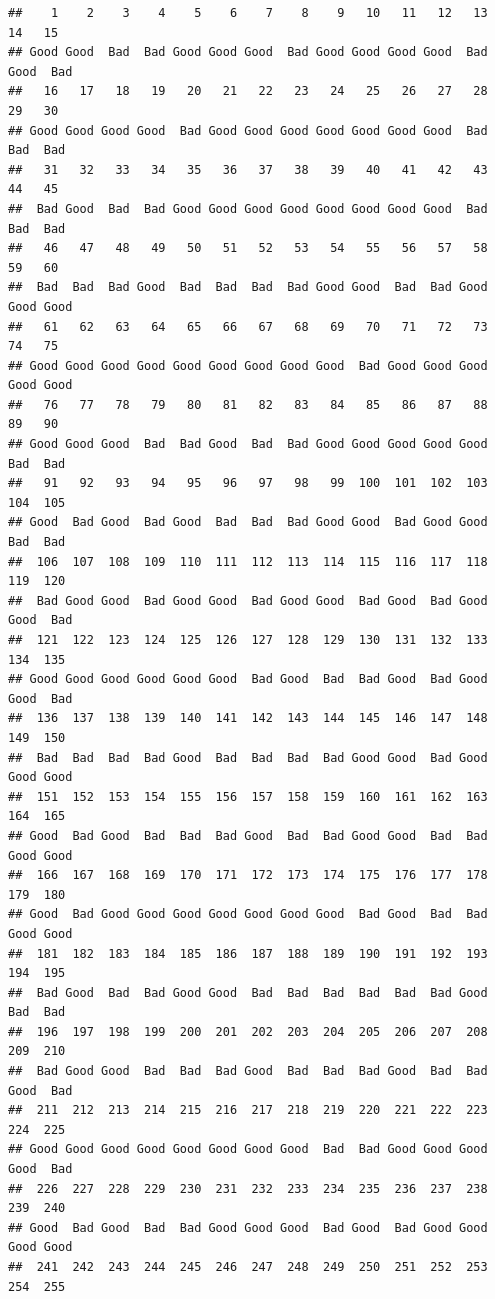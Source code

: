 \documentclass[]{article}
\begin{document}
\begin{verbatim}
##    1    2    3    4    5    6    7    8    9   10   11   12   13   14   15 
## Good Good  Bad  Bad Good Good Good  Bad Good Good Good Good  Bad Good  Bad 
##   16   17   18   19   20   21   22   23   24   25   26   27   28   29   30 
## Good Good Good Good  Bad Good Good Good Good Good Good Good  Bad  Bad  Bad 
##   31   32   33   34   35   36   37   38   39   40   41   42   43   44   45 
##  Bad Good  Bad  Bad Good Good Good Good Good Good Good Good  Bad  Bad  Bad 
##   46   47   48   49   50   51   52   53   54   55   56   57   58   59   60 
##  Bad  Bad  Bad Good  Bad  Bad  Bad  Bad Good Good  Bad  Bad Good Good Good 
##   61   62   63   64   65   66   67   68   69   70   71   72   73   74   75 
## Good Good Good Good Good Good Good Good Good  Bad Good Good Good Good Good 
##   76   77   78   79   80   81   82   83   84   85   86   87   88   89   90 
## Good Good Good  Bad  Bad Good  Bad  Bad Good Good Good Good Good  Bad  Bad 
##   91   92   93   94   95   96   97   98   99  100  101  102  103  104  105 
## Good  Bad Good  Bad Good  Bad  Bad  Bad Good Good  Bad Good Good  Bad  Bad 
##  106  107  108  109  110  111  112  113  114  115  116  117  118  119  120 
##  Bad Good Good  Bad Good Good  Bad Good Good  Bad Good  Bad Good Good  Bad 
##  121  122  123  124  125  126  127  128  129  130  131  132  133  134  135 
## Good Good Good Good Good Good  Bad Good  Bad  Bad Good  Bad Good Good  Bad 
##  136  137  138  139  140  141  142  143  144  145  146  147  148  149  150 
##  Bad  Bad  Bad  Bad Good  Bad  Bad  Bad  Bad Good Good  Bad Good Good Good 
##  151  152  153  154  155  156  157  158  159  160  161  162  163  164  165 
## Good  Bad Good  Bad  Bad  Bad Good  Bad  Bad Good Good  Bad  Bad Good Good 
##  166  167  168  169  170  171  172  173  174  175  176  177  178  179  180 
## Good  Bad Good Good Good Good Good Good Good  Bad Good  Bad  Bad Good Good 
##  181  182  183  184  185  186  187  188  189  190  191  192  193  194  195 
##  Bad Good  Bad  Bad Good Good  Bad  Bad  Bad  Bad  Bad  Bad Good  Bad  Bad 
##  196  197  198  199  200  201  202  203  204  205  206  207  208  209  210 
##  Bad Good Good  Bad  Bad  Bad Good  Bad  Bad  Bad Good  Bad  Bad Good  Bad 
##  211  212  213  214  215  216  217  218  219  220  221  222  223  224  225 
## Good Good Good Good Good Good Good Good  Bad  Bad Good Good Good Good  Bad 
##  226  227  228  229  230  231  232  233  234  235  236  237  238  239  240 
## Good  Bad Good  Bad  Bad Good Good Good  Bad Good  Bad Good Good Good Good 
##  241  242  243  244  245  246  247  248  249  250  251  252  253  254  255 

\end{verbatim}
\end{document}
